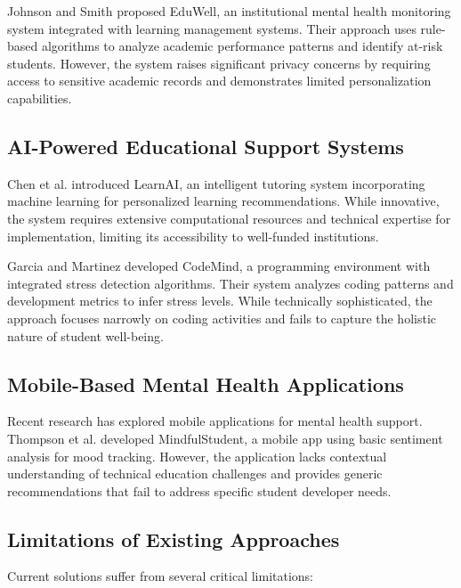 \documentclass[conference,10pt]{IEEEtran}
\begin{document}
Johnson and Smith \cite{johnson2019} proposed EduWell, an institutional mental health monitoring system integrated with learning management systems. Their approach uses rule-based algorithms to analyze academic performance patterns and identify at-risk students. However, the system raises significant privacy concerns by requiring access to sensitive academic records and demonstrates limited personalization capabilities.

\subsection{AI-Powered Educational Support Systems}

Chen et al. \cite{chen2021} introduced LearnAI, an intelligent tutoring system incorporating machine learning for personalized learning recommendations. While innovative, the system requires extensive computational resources and technical expertise for implementation, limiting its accessibility to well-funded institutions.

Garcia and Martinez \cite{garcia2020} developed CodeMind, a programming environment with integrated stress detection algorithms. Their system analyzes coding patterns and development metrics to infer stress levels. While technically sophisticated, the approach focuses narrowly on coding activities and fails to capture the holistic nature of student well-being.

\subsection{Mobile-Based Mental Health Applications}

Recent research has explored mobile applications for mental health support. Thompson et al. \cite{thompson2020} developed MindfulStudent, a mobile app using basic sentiment analysis for mood tracking. However, the application lacks contextual understanding of technical education challenges and provides generic recommendations that fail to address specific student developer needs.

\subsection{Limitations of Existing Approaches}

Current solutions suffer from several critical limitations:
\end{document}
